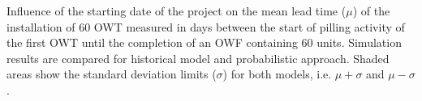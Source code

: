 \label{fig:comparison}
Influence of the starting date of the project on the mean lead time ($\mu$) of the installation of 60 OWT measured in days between the start of pilling activity of the first OWT until the completion of an OWF containing 60 units. Simulation results are compared for historical model and probabilistic approach. Shaded areas show the standard deviation limits ($\sigma$) for both models, i.e. $\mu + \sigma$ and $\mu - \sigma$. 